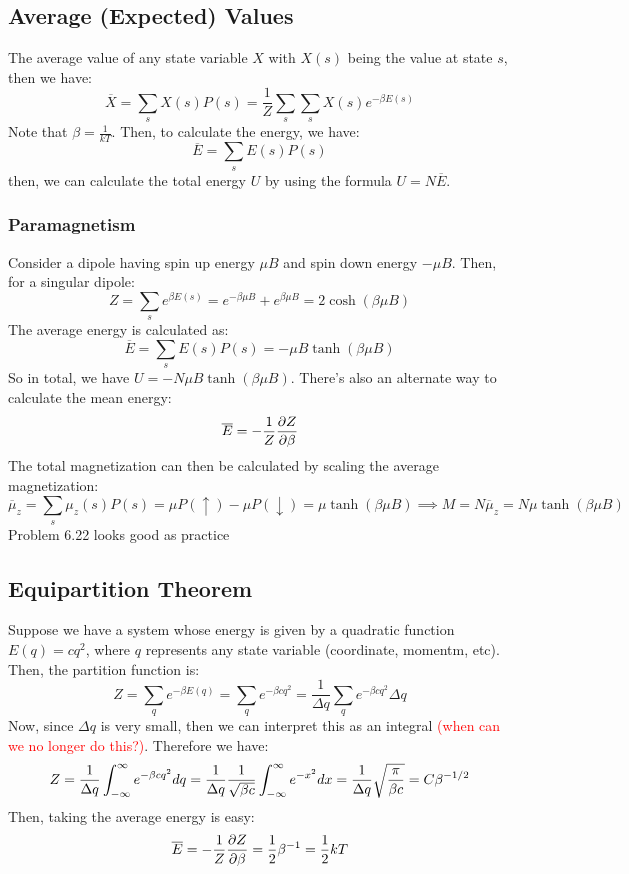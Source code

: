 \documentclass[10pt]{article}
\newcommand{\question}[1]{\textcolor{red}{#1}}
\renewcommand{\comment}[1]{\textcolor{blue!50}{#1}}
\begin{document}
	\subsection{Average (Expected) Values}
	The average value of any state variable \( X \) with \( X(s) \) being the value at state \( s \), then we have:
	\[
	\overline X = \sum_s X(s) P(s) = \frac{1}{Z} \sum_s \sum_s X(s) e^{-\beta E(s)}
	\] 
	Note that \( \beta = \frac{1}{kT} \). Then, to calculate the energy, we have:
	\[
	\overline E = \sum_s E(s) P(s) 
	\] 
	then, we can calculate the total energy \( U \) by using the formula \( U = N \overline E \).    

	\subsubsection{Paramagnetism}

	Consider a dipole having spin up energy \( \mu B \)  and spin down energy  \( -\mu B \). Then, for a singular dipole:
	\[
		Z = \sum_s e^{\beta E(s)} = e^{-\beta \mu B} + e^{\beta \mu B} = 2 \cosh(\beta \mu B) 
	\] 
	The average energy is calculated as:
	\[
	\overline E = \sum_s E(s) P(s) = -\mu B \tanh(\beta \mu B)
	\] 
	So in total, we have \( U = -N \mu B \tanh(\beta \mu B) \). There's also an alternate way to calculate the mean energy:
	\[
		\overline E = -\frac{1}{Z} \pdv{Z}{\beta}
	\] 
	The total magnetization can then be calculated by scaling the average magnetization:
	\[
	\overline \mu_z = \sum_s \mu_z(s) P(s) = \mu P(\uparrow) - \mu P(\downarrow) = \mu \tanh(\beta \mu B) \implies M = N 
	\overline \mu_z = N \mu \tanh(\beta \mu B)
	\] 
	\comment{Problem 6.22 looks good as practice}

	\subsection{Equipartition Theorem}
	Suppose we have a system whose energy is given by a quadratic function \( E(q) = cq^2 \), where \( q \) represents any 
	state variable (coordinate, momentm, etc). Then, the partition function is:
	\[
	Z = \sum_q e^{-\beta E(q)} = \sum_q e^{-\beta cq^2} = \frac{1}{\Delta q} \sum_q e^{-\beta cq^2} \Delta q
	\]
	Now, since \( \Delta q \) is very small, then we can interpret this as an integral \question{(when can we no longer do this?)}. 
	Therefore we have:
	\[
	Z = \frac{1}{\Delta q} \int_{-\infty}^{\infty} e^{-\beta cq^2} dq = \frac{1}{\Delta q} \frac{1}{\sqrt{\beta c} }\int_{-\infty}^{\infty} e^{-x^2}dx
	= \frac{1}{\Delta q} \sqrt{\frac{\pi}{\beta c}}  = C \beta^{-1 / 2}
	\] 
	Then, taking the average energy is easy:
	\[
		\overline E = -\frac{1}{Z} \pdv{Z}{\beta} = \frac{1}{2}\beta^{-1} = \frac{1}{2}kT
	\] 
\end{document}
